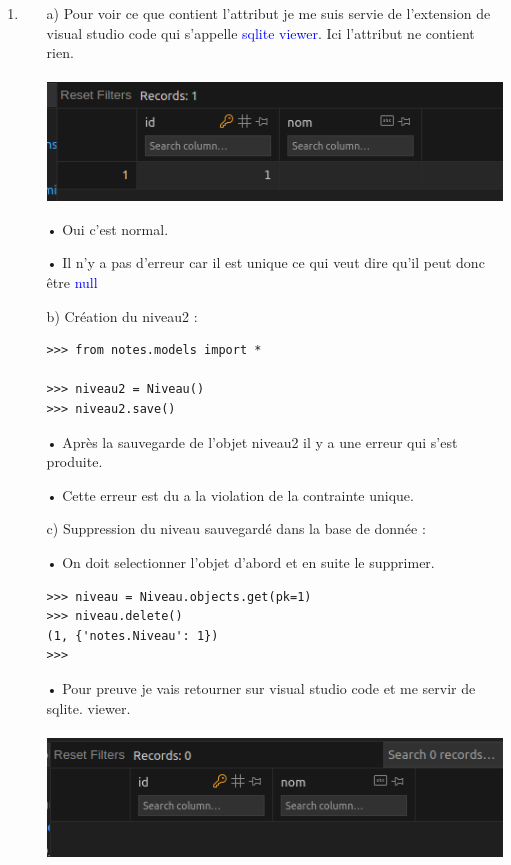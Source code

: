 \documentclass[10pt,a4paper]{article}
\begin{document}
\begin{enumerate}
\item 
\begin{itemize}
\item[]
\item[a)] Pour voir ce que contient l'attribut je me suis servie de l'extension de visual studio code qui s’appelle \textcolor{blue}{sqlite viewer}. Ici l'attribut ne contient rien.\\\\
\includegraphics[scale=0.6]{1.png}
\item[•] Oui c'est normal.
\item[•] Il n'y a pas d'erreur car il est unique ce qui veut dire qu'il peut donc être \textcolor{blue}{null}\\

\item[b)] Création du niveau2 : \\
\begin{verbatim}
>>> from notes.models import *

>>> niveau2 = Niveau()
>>> niveau2.save()

\end{verbatim}
\item[•] Après la sauvegarde de l'objet niveau2 il y a une erreur qui s'est produite.
\item[•] Cette erreur est du a la violation de la contrainte unique.\\

\item[c)] Suppression du niveau sauvegardé dans la base de donnée : \\
\item[•]On doit selectionner l'objet d'abord et en suite le supprimer.\\
\begin{verbatim}
>>> niveau = Niveau.objects.get(pk=1)
>>> niveau.delete()
(1, {'notes.Niveau': 1})
>>> 
\end{verbatim}
\item[•] Pour preuve je vais retourner sur visual studio code et me servir de sqlite. viewer.\\\\
\includegraphics[scale=0.6]{2.png}



\end{itemize}
\end{enumerate}
\end{document}
